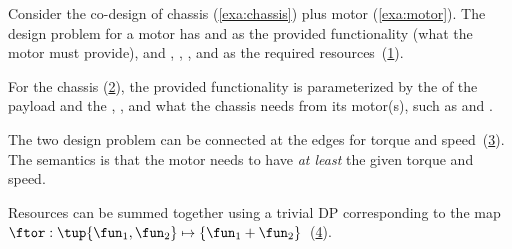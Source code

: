 \begin{example}
    \label{exa:chassis_plus_motor}
    Consider the co-design of chassis (\cref{exa:chassis}) plus motor (\cref{exa:motor}).
    The design problem for a motor has  and  as the provided functionality (what the motor must provide), and , , , and  as the required resources~(\cref{fig:motor}).

    \begin{figure}[h!]
        \centering
        \caption{}
        \label{fig:motor}
    \end{figure}

    For the chassis (\cref{fig:gmcdp_chassis}), the provided functionality is parameterized by the  of the payload and the , , and what the chassis needs from its motor(s), such as  and .

    \begin{figure}[h!]
        \centering
        \caption{}
        \label{fig:gmcdp_chassis}
    \end{figure}

    The two design problem can be connected at the edges for torque and speed~(\cref{fig:gmcdp_chassis_plus_motor_series}).
    The semantics is that the motor needs to have \emph{at least} the given torque and speed.


    \begin{figure}[h!]
        \centering
        \caption{}
        \label{fig:gmcdp_chassis_plus_motor_series}
    \end{figure}

    Resources can be summed together using a trivial DP corresponding to the map $\ftor:\tup{\fun_{1},\fun_{2}} \mapsto\{\fun_{1}+\fun_{2}\}$~(\cref{fig:total_cost}).

    \begin{figure}[h!]
        \centering
        \caption{}
        \label{fig:total_cost}
    \end{figure}


\end{example}
